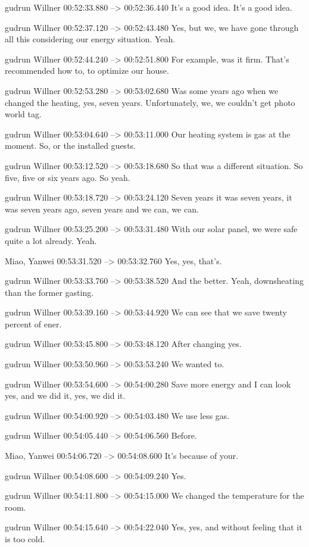 {gudrun Willner 00:52:33.880 --> 00:52:36.440
It's a good idea. It's a good idea.

gudrun Willner 00:52:37.120 --> 00:52:43.480
Yes, but we, we have gone through all this considering our energy situation. Yeah.

gudrun Willner 00:52:44.240 --> 00:52:51.800
For example, was it firm. That's recommended how to, to optimize our house.

gudrun Willner 00:52:53.280 --> 00:53:02.680
Was some years ago when we changed the heating, yes, seven years. Unfortunately, we, we couldn't get photo world tag.

gudrun Willner 00:53:04.640 --> 00:53:11.000
Our heating system is gas at the moment. So, or the installed guests.

gudrun Willner 00:53:12.520 --> 00:53:18.680
So that was a different situation. So five, five or six years ago. So yeah.

gudrun Willner 00:53:18.720 --> 00:53:24.120
Seven years it was seven years, it was seven years ago, seven years and we can, we can.

gudrun Willner 00:53:25.200 --> 00:53:31.480
With our solar panel, we were safe quite a lot already. Yeah.

Miao, Yanwei 00:53:31.520 --> 00:53:32.760
Yes, yes, that's.

gudrun Willner 00:53:33.760 --> 00:53:38.520
And the better. Yeah, downsheating than the former gasting.

gudrun Willner 00:53:39.160 --> 00:53:44.920
We can see that we save twenty percent of ener.

gudrun Willner 00:53:45.800 --> 00:53:48.120
After changing yes.

gudrun Willner 00:53:50.960 --> 00:53:53.240
We wanted to.

gudrun Willner 00:53:54.600 --> 00:54:00.280
Save more energy and I can look yes, and we did it, yes, we did it.

gudrun Willner 00:54:00.920 --> 00:54:03.480
We use less gas.

gudrun Willner 00:54:05.440 --> 00:54:06.560
Before.

Miao, Yanwei 00:54:06.720 --> 00:54:08.600
It's because of your.

gudrun Willner 00:54:08.600 --> 00:54:09.240
Yes.

gudrun Willner 00:54:11.800 --> 00:54:15.000
We changed the temperature for the room.

gudrun Willner 00:54:15.640 --> 00:54:22.040
Yes, yes, and without feeling that it is too cold.

}
